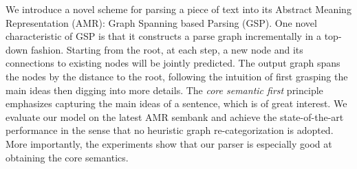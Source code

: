 We introduce a novel scheme for parsing a piece of text into its Abstract Meaning Representation (AMR): Graph Spanning based Parsing (GSP). One novel characteristic of GSP is that it constructs a parse graph incrementally in a top-down fashion. Starting from the root, at each step, a new node and its connections to existing nodes will be jointly predicted. The output graph spans the nodes by the distance to the root, following the intuition of first grasping the main ideas then digging into more details. The \textit{core semantic first} principle emphasizes capturing the main ideas of a sentence, which is of great interest. We evaluate our model on the latest AMR sembank and achieve the state-of-the-art performance in the sense that no heuristic graph re-categorization is adopted. More importantly, the experiments show that our parser is especially good at obtaining the core semantics.
